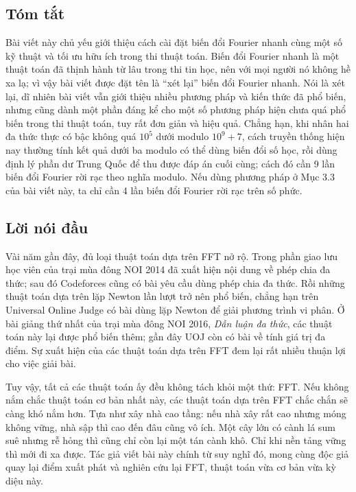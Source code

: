 \documentclass[11pt]{article}
\begin{document}
\subsection*{Tóm tắt}

Bài viết này chủ yếu giới thiệu cách cài đặt biến đổi Fourier nhanh cùng một
số kỹ thuật và tối ưu hữu ích trong thi thuật toán. Biến đổi Fourier nhanh là
một thuật toán đã thịnh hành từ lâu trong thi tin học, nên với mọi người nó
không hề xa lạ; vì vậy bài viết được đặt tên là ``xét lại'' biến đổi Fourier
nhanh. Nói là xét lại, dĩ nhiên bài viết vẫn giới thiệu nhiều phương pháp và
kiến thức đã phổ biến, nhưng cũng dành một phần đáng kể cho một số phương pháp
hiện chưa quá phổ biến trong thi thuật toán, tuy rất đơn giản và hiệu quả.
Chẳng hạn, khi nhân hai đa thức thực có bậc không quá \(10^5\) dưới modulo
\(10^9+7\), cách truyền thống hiện nay thường tính kết quả dưới ba modulo có
thể dùng biến đổi số học, rồi dùng định lý phần dư Trung Quốc để thu được đáp
án cuối cùng; cách đó cần 9 lần biến đổi Fourier rời rạc theo nghĩa modulo.
Nếu dùng phương pháp ở Mục 3.3 của bài viết này, ta chỉ cần 4 lần biến đổi
Fourier rời rạc trên số phức.

\subsection*{Lời nói đầu}

Vài năm gần đây, đủ loại thuật toán dựa trên FFT nở rộ. Trong phần giao lưu
học viên của trại mùa đông NOI 2014 đã xuất hiện nội dung về phép chia đa
thức; sau đó Codeforces cũng có bài yêu cầu dùng phép chia đa thức. Rồi những
thuật toán dựa trên lặp Newton lần lượt trở nên phổ biến, chẳng hạn trên
Universal Online Judge có bài dùng lặp Newton để giải phương trình vi phân. Ở
bài giảng thứ nhất của trại mùa đông NOI 2016, \emph{Dẫn luận đa thức}, các
thuật toán này lại được phổ biến thêm; gần đây UOJ còn có bài về tính giá trị
đa điểm. Sự xuất hiện của các thuật toán dựa trên FFT đem lại rất nhiều thuận
lợi cho việc giải bài.

Tuy vậy, tất cả các thuật toán ấy đều không tách khỏi một thứ: FFT. Nếu không
nắm chắc thuật toán cơ bản nhất này, các thuật toán dựa trên FFT chắc chắn sẽ
càng khó nắm hơn. Tựa như xây nhà cao tầng: nếu nhà xây rất cao nhưng móng
không vững, nhà sập thì cao đến đâu cũng vô ích. Một cây lớn có cành lá sum
suê nhưng rễ hỏng thì cũng chỉ còn lại một tán cành khô. Chỉ khi nền tảng
vững thì mới đi xa được. Tác giả viết bài này chính từ suy nghĩ đó, mong cùng
độc giả quay lại điểm xuất phát và nghiên cứu lại FFT, thuật toán vừa cơ bản
vừa kỳ diệu này.
\end{document}
